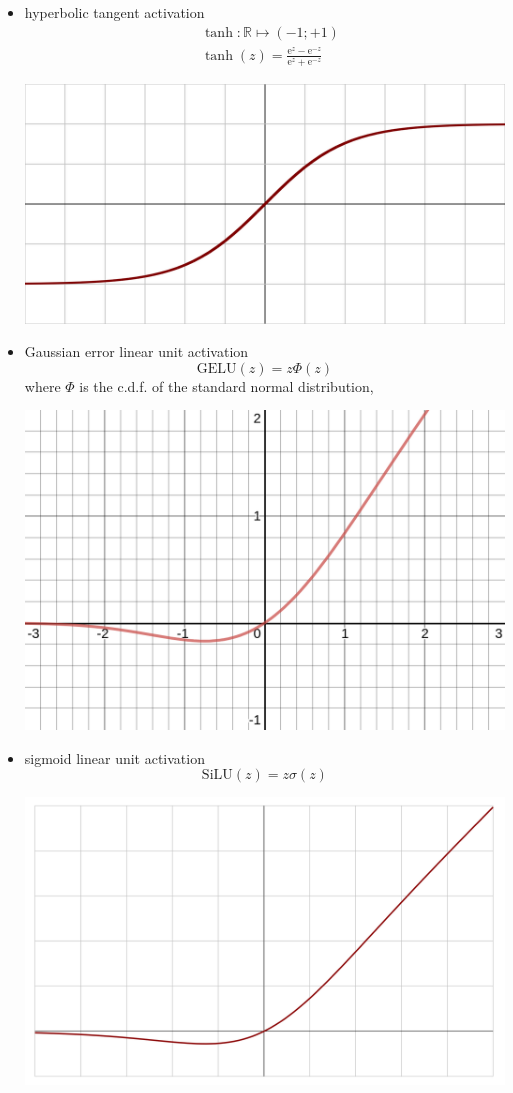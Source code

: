 \documentclass[a5paper]{article}
\newcommand{\Rbb}{\mathbb{R}}
\newcommand{\e}{\mathrm{e}}
\begin{document}
\begin{itemize}
   \item hyperbolic tangent activation
   \[
   \begin{split}
      &\tanh: \Rbb \mapsto (-1;+1)\\
      &\tanh(z) = \frac{\e^{z} - \e^{-z}}{\e^{z} + \e^{-z}}
   \end{split}
   \]
   \begin{center}
   \includegraphics[width=0.5\columnwidth]{figs/Activation_tanh.svg.png}
   \end{center}

   \item Gaussian error linear unit activation
   \[
      \text{GELU}(z) = z \Phi(z)
   \]
   where $\Phi$ is the c.d.f. of the standard normal distribution,
   \begin{center}
   \includegraphics[width=0.5\columnwidth]{figs/Activation_gelu.png}
   \end{center}

   \item sigmoid linear unit activation
   \[
      \text{SiLU}(z) = z \sigma(z)
   \]
   \begin{center}
   \includegraphics[width=0.5\columnwidth]{figs/Activation_Swish.svg.png}
   \end{center}

\end{itemize}
\end{document}
